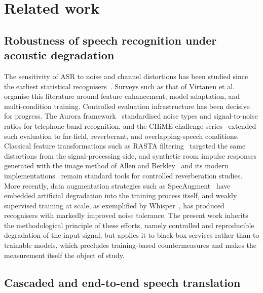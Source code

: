 \section{Related work}
\label{sec:related}

\subsection{Robustness of speech recognition under acoustic degradation}

The sensitivity of ASR to noise and channel distortions has been studied since
the earliest statistical recognisers~\cite{lippmann1997speech}. Surveys such
as that of Virtanen et al.~\cite{li2014overview} organise this
literature around feature enhancement, model adaptation, and multi-condition
training. Controlled evaluation infrastructure has been decisive for
progress. The Aurora framework~\cite{pearce2000aurora} standardised noise
types and signal-to-noise ratios for telephone-band recognition, and the CHiME
challenge series~\cite{barker2018fifth} extended such evaluation to
far-field, reverberant, and overlapping-speech conditions. Classical feature
transformations such as RASTA filtering~\cite{hermansky1994rasta} targeted the
same distortions from the signal-processing side, and synthetic room impulse
responses generated with the image method of Allen and
Berkley~\cite{allen1979image} and its modern
implementations~\cite{habets2006room} remain standard tools for controlled
reverberation studies. More recently, data augmentation strategies such as
SpecAugment~\cite{park2019specaugment} have embedded artificial degradation
into the training process itself, and weakly supervised training at scale, as
exemplified by Whisper~\cite{radford2023robust}, has produced recognisers
with markedly improved noise tolerance. The present work inherits the
methodological principle of these efforts, namely controlled and reproducible
degradation of the input signal, but applies it to black-box services rather
than to trainable models, which precludes training-based countermeasures and
makes the measurement itself the object of study.

\subsection{Cascaded and end-to-end speech translation}

